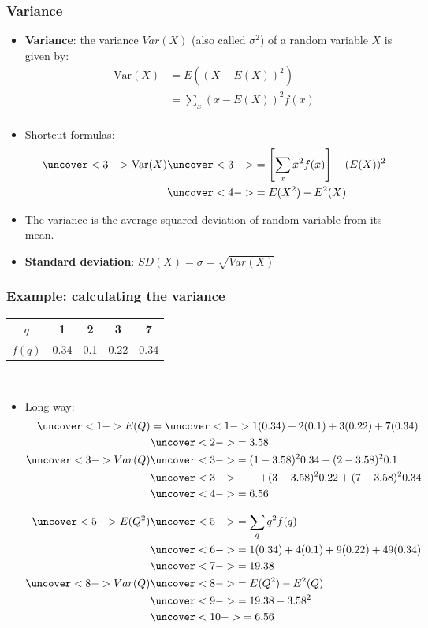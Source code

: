 \documentclass[handout]{beamer}\usepackage[]{graphicx}\usepackage[]{color}
\providecommand{\q}{$\quad$ \newline}
\numberwithin{equation}{section}
\begin{document}
\begin{frame}
\frametitle{Variance}
\begin{itemize}
\pause \item {\bf Variance}: the variance $Var(X)$ (also called $\sigma^2$) of a random variable $X$ is given by:
\begin{align*}
\text{Var} (X) &= E((X - E(X))^2) \\
&=\sum_x (x - E(X))^2 f(x) \\
\end{align*}
\pause \item Shortcut formulas:
\begin{align*}
\uncover<3->{\text{Var} (X) }  & \uncover<3->{= \left [ \sum_x x^2 f(x) \right ]  - (E(X))^2} \\
 & \uncover<4->{= E(X^2) - E^2(X)} \\
\end{align*}
\pause \pause \item The variance is the average squared deviation of random variable from its mean.
\pause \item {\bf Standard deviation}: $SD(X) = \sigma = \sqrt{Var(X)}$
\end{itemize}
\end{frame}

\begin{frame}
\frametitle{Example: calculating the variance} \scriptsize
\begin{tabular}{ccccc}
$q$ & 1 & 2 & 3 & 7  \\ \hline
$f(q)$ & 0.34 & 0.1 & 0.22 & 0.34\\
\end{tabular} \q

\begin{itemize}
\item Long way:
\begin{align*}
\uncover<1->{E(Q)} &= \uncover<1->{ 1 (0.34) + 2(0.1) + 3(0.22) + 7(0.34) }\\
& \uncover<2->{= 3.58} \\
\uncover<3->{Var (Q)} & \uncover<3->{= (1 - 3.58)^2 0.34 + (2-3.58)^2 0.1} \\
& \uncover<3->{\qquad + (3 - 3.58)^2 0.22 + (7-3.58)^2 0.34} \\
& \uncover<4->{= 6.56}
\end{align*}


\begin{align*}
\uncover<5->{E(Q^2)} & \uncover<5->{= \sum_{q} q^2 f(q)} \\
&\uncover<6->{ = 1 (0.34) + 4(0.1) + 9(0.22) + 49(0.34)} \\
& \uncover<7->{= 19.38} \\
\uncover<8->{Var(Q) }& \uncover<8->{= E(Q^2) - E^2(Q)} \\
& \uncover<9->{= 19.38 - 3.58^2} \\
&\uncover<10->{ = 6.56}
\end{align*}
\end{itemize}
\end{frame}
\end{document}
